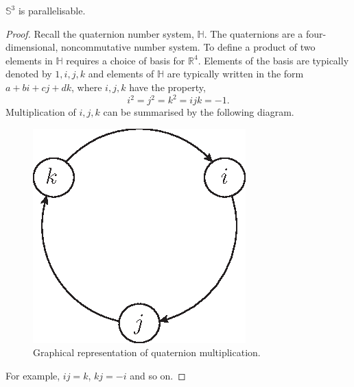 \begin{proposition}
$\mathbb{S}^3$ is parallelisable.
\end{proposition}
\begin{proof}
Recall the quaternion number system, $\mathbb{H}$. The quaternions are a four-dimensional, noncommutative number system. To define a product of two elements in $\mathbb{H}$ requires a choice of basis for $\mathbb{R}^4$. Elements of the basis are typically denoted by $1,i,j,k$ and elements of $\mathbb{H}$ are typically written in the form $a+bi+cj+dk$, where $i,j,k$ have the property,
\[
i^2=j^2=k^2=ijk=-1.
\]
Multiplication of $i,j,k$ can be summarised by the following diagram.

\begin{figure}[h!]
\centering
\includegraphics[scale=1]{fig/quat-mult}
\caption{Graphical representation of quaternion multiplication.}
\label{fig:quat-mul}
\end{figure}

For example, $ij=k$, $kj=-i$ and so on.


\end{proof}
